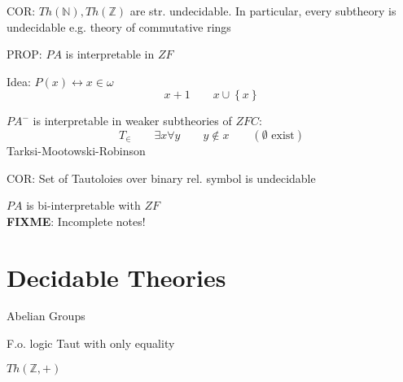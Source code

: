 \documentclass[12pt]{article}
\newcommand{\Nat}{\ensuremath{\mathbb{N}}}
\newcommand{\Integer}{\ensuremath{\mathbb{Z}}}
\newcommand{\fixme}{\\ \textbf{FIXME}: Incomplete notes!}
\begin{document}
COR: $Th(\Nat), Th(\Integer)$ are str. undecidable.
In particular, every subtheory is undecidable
e.g. theory of commutative rings

PROP: $PA$ is interpretable in $ZF$

Idea: $P(x) \leftrightarrow x \in \omega$
\[
x+1 \qquad x \cup \left\{ x \right\}
\]

$PA^-$ is interpretable in weaker subtheories of $ZFC$:
\[
T_\in 
\qquad
\exists x \forall y
\qquad
y \not\in x
\qquad
(\emptyset \text{ exist})
\]
Tarksi-Mootowski-Robinson

COR: Set of Tautoloies over binary rel. symbol is undecidable

$PA$ is bi-interpretable with $ZF$\fixme

\section*{Decidable Theories}

Abelian Groups

F.o. logic Taut with only equality

$Th(\Integer, +)$
\end{document}
